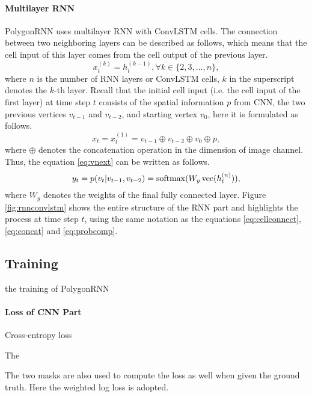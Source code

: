 

\paragraph{Multilayer RNN}
PolygonRNN uses multilayer RNN with ConvLSTM cells. The connection between two neighboring layers can be described as follows, which means that the cell input of this layer comes from the cell output of the previous layer.
\begin{equation}\label{eq:cellconnect}
	x_t^{(k)} = h_t^{(k-1)}, \forall k \in \{2,3,...,n\},
\end{equation}
where $n$ is the number of RNN layers or ConvLSTM cells, $k$ in the superscript denotes the $k$-th layer. Recall that the initial cell input (i.e. the cell input of the first layer) at time step $t$ consists of the spatial information $p$ from CNN, the two previous vertices $v_{t-1}$ and $v_{t-2}$, and starting vertex $v_0$, here it is formulated as follows.
\begin{equation}\label{eq:concat}
	x_t = x_t^{(1)} = v_{t-1} \oplus v_{t-2} \oplus v_0 \oplus p,
\end{equation}
where $\oplus$ denotes the concatenation operation in the dimension of image channel. Thus, the equation \ref{eq:vnext} can be written as follows.
\begin{equation}\label{eq:probcomp}
	y_t = p(v_t|v_{t-1}, v_{t-2}) = \operatorname{softmax}(W_y\operatorname{vec}(h_t^{(n)})),
\end{equation}
where $W_y$ denotes the weights of the final fully connected layer. Figure \ref{fig:rnnconvlstm} shows the entire structure of the RNN part and highlights the process at time step $t$, using the same notation as the equations \ref{eq:cellconnect}, \ref{eq:concat} and \ref{eq:probcomp}.



\subsection{Training}
the training of PolygonRNN

\paragraph{Loss of CNN Part}
Cross-entropy loss

The 

The two masks are also used to compute the loss as well when given the ground truth. Here the weighted log loss is adopted.

